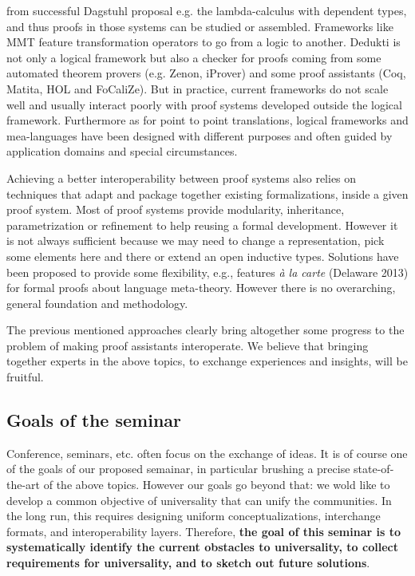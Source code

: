 \begin{oldpart}{from successful Dagstuhl proposal}
 e.g. the lambda-calculus with dependent types, and thus proofs in
 those systems can be studied or assembled. Frameworks like MMT
 feature transformation operators to go from a logic to
 another. Dedukti is not only a logical framework but also a checker
 for proofs coming from some automated theorem provers
(e.g. Zenon, iProver) and some proof assistants (Coq, Matita, HOL and
 FoCaliZe). But in practice, current
 frameworks do not scale well and usually interact poorly with
 proof systems developed outside the logical framework. Furthermore as
 for point to point translations, logical frameworks and mea-languages
 have been designed with different purposes and often guided by
 application domains and special circumstances.   

Achieving a better interoperability between proof systems also  
 relies on techniques that adapt and package together existing
 formalizations, inside a given proof system. Most of proof systems
 provide modularity, inheritance, parametrization or  refinement to
 help reusing a formal development. However it is not always
 sufficient because we may need to change a representation, pick some
 elements here and there or extend an open inductive types. Solutions
 have been proposed to provide some flexibility, e.g.,  features {\em \`a la
 carte} (Delaware 2013) for formal proofs about language
 meta-theory. However there is no
overarching, general foundation and methodology. 

%

The previous mentioned approaches clearly bring altogether some
progress  to the problem of   making proof assistants interoperate. We
believe that bringing together experts in the above topics,  
to exchange experiences and insights, will be fruitful.


\subsection{Goals of the seminar}

Conference, seminars, etc. often focus on the exchange of ideas. It is
of course one of the goals of our proposed semainar, in particular
brushing a precise state-of-the-art of the above topics. 
However our goals go beyond that: we wold like to develop a common
objective of universality that can unify the communities. In the long run, this requires designing uniform conceptualizations, interchange formats, and interoperability layers.
Therefore, \textbf{the goal of this seminar is to systematically identify the current obstacles to universality, to collect requirements for universality, and to sketch out future solutions}.


\end{oldpart}
